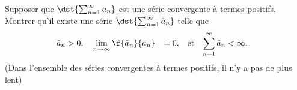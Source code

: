 
\begin{exercice}\label{exo0063}

Supposer que $\dst{\sum_{n=1}^\infty a_n}$ est une série convergente à termes positifs. Montrer qu'il existe une série $\dst{\sum_{n=1}^\infty \tilde{a}_n}$  telle que
\begin{equation}
	\begin{aligned}[]
		\tilde{a}_n					&>0,&&
		\lim_{n\rightarrow \infty}\f{\tilde{a}_n}{a_n}	&= 0,&&
		\text{et}&&
		\sum_{n=1}^\infty \tilde{a}_n			&<\infty.
	\end{aligned}
\end{equation}
(Dans l'ensemble des séries convergentes à termes positifs, il n'y a pas de plus lent)

\end{exercice}
